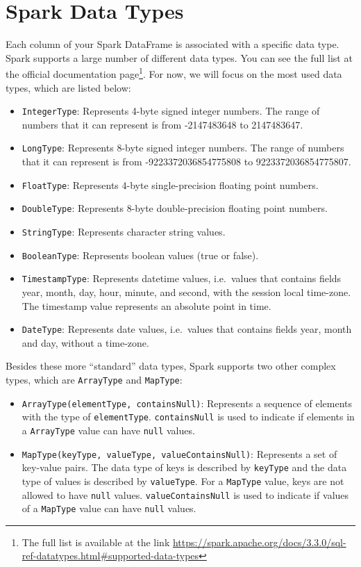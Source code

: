 \documentclass[
  11pt,
  letterpaper,
  DIV=11,
  numbers=noendperiod]{scrreprt}
\providecommand{\tightlist}{%
  \setlength{\itemsep}{0pt}\setlength{\parskip}{0pt}}\usepackage{longtable,booktabs,array}
\begin{document}
\section{Spark Data Types}\label{spark-data-types}

Each column of your Spark DataFrame is associated with a specific data
type. Spark supports a large number of different data types. You can see
the full list at the official documentation page\footnote{The full list
  is available at the link
  \url{https://spark.apache.org/docs/3.3.0/sql-ref-datatypes.html\#supported-data-types}}.
For now, we will focus on the most used data types, which are listed
below:

\begin{itemize}
\tightlist
\item
  \texttt{IntegerType}: Represents 4-byte signed integer numbers. The
  range of numbers that it can represent is from -2147483648 to
  2147483647.
\item
  \texttt{LongType}: Represents 8-byte signed integer numbers. The range
  of numbers that it can represent is from -9223372036854775808 to
  9223372036854775807.
\item
  \texttt{FloatType}: Represents 4-byte single-precision floating point
  numbers.
\item
  \texttt{DoubleType}: Represents 8-byte double-precision floating point
  numbers.
\item
  \texttt{StringType}: Represents character string values.
\item
  \texttt{BooleanType}: Represents boolean values (true or false).
\item
  \texttt{TimestampType}: Represents datetime values, i.e.~values that
  contains fields year, month, day, hour, minute, and second, with the
  session local time-zone. The timestamp value represents an absolute
  point in time.
\item
  \texttt{DateType}: Represents date values, i.e.~values that contains
  fields year, month and day, without a time-zone.
\end{itemize}

Besides these more ``standard'' data types, Spark supports two other
complex types, which are \texttt{ArrayType} and \texttt{MapType}:

\begin{itemize}
\item
  \texttt{ArrayType(elementType,\ containsNull)}: Represents a sequence
  of elements with the type of \texttt{elementType}.
  \texttt{containsNull} is used to indicate if elements in a
  \texttt{ArrayType} value can have \texttt{null} values.
\item
  \texttt{MapType(keyType,\ valueType,\ valueContainsNull)}: Represents
  a set of key-value pairs. The data type of keys is described by
  \texttt{keyType} and the data type of values is described by
  \texttt{valueType}. For a \texttt{MapType} value, keys are not allowed
  to have \texttt{null} values. \texttt{valueContainsNull} is used to
  indicate if values of a \texttt{MapType} value can have \texttt{null}
  values.
\end{itemize}
\end{document}

